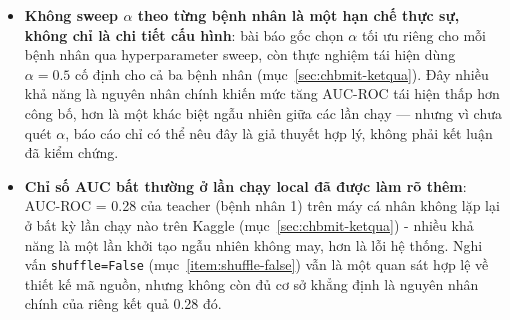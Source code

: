 \begin{itemize}
	Baseline yếu hoặc suy biến thì FGL cải thiện mạnh về số tương đối nhưng giá trị tuyệt đối có
	thể vẫn chưa cao. Phần khác biệt còn lại đến từ việc mã nguồn CHB-MIT không cố định seed
	ngẫu nhiên và báo cáo chọn test thử sâu trên ba bệnh nhân (do giới hạn tài nguyên GPU miễn
	phí trên Kaggle, mục~\ref{sec:chbmit-ketqua}) thay vì dàn trải trên toàn bộ 12 bệnh nhân
	mà bài báo gốc dùng, trong khi bài báo có thể
	đã lấy trung bình trên nhiều bệnh nhân và lần chạy hơn. Đây là điểm tái hiện \textbf{không
	ủng hộ rõ} tuyên bố của bài báo trên bộ dữ liệu này, cần nêu rõ thay vì bỏ qua.
	\item \textbf{Không sweep $\alpha$ theo từng bệnh nhân là một hạn chế thực sự, không chỉ là
	chi tiết cấu hình}: bài báo gốc chọn $\alpha$ tối ưu riêng cho mỗi bệnh nhân qua
	hyperparameter sweep, còn thực nghiệm tái hiện dùng $\alpha=0.5$ cố định cho cả ba bệnh nhân
	(mục~\ref{sec:chbmit-ketqua}). Đây nhiều khả năng là nguyên nhân chính khiến mức tăng AUC-ROC
	tái hiện thấp hơn công bố, hơn là một khác biệt ngẫu nhiên giữa các lần chạy --- nhưng vì
	chưa quét $\alpha$, báo cáo chỉ có thể nêu đây là giả thuyết hợp lý, không phải kết luận đã
	kiểm chứng.
	\item \textbf{Chỉ số AUC bất thường ở lần chạy local đã được làm rõ thêm}: AUC-ROC = 0.28 của
	teacher (bệnh nhân 1) trên máy cá nhân không lặp lại ở bất kỳ lần chạy nào trên Kaggle
	(mục~\ref{sec:chbmit-ketqua}) - nhiều khả năng là một lần khởi tạo ngẫu nhiên không may,
	hơn là lỗi hệ thống. Nghi vấn \texttt{shuffle=False} (mục~\ref{item:shuffle-false}) vẫn là
	một quan sát hợp lệ về thiết kế mã nguồn, nhưng không còn đủ cơ sở khẳng định là nguyên
	nhân chính của riêng kết quả 0.28 đó.
\end{itemize}
